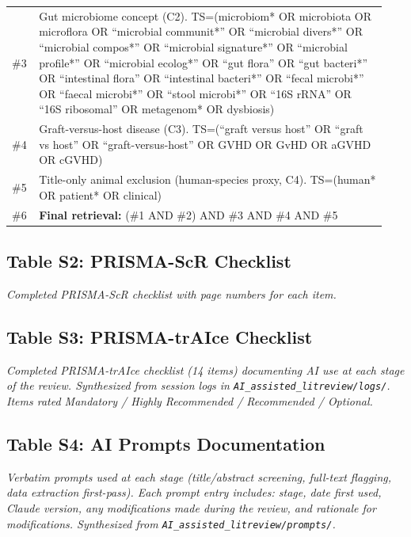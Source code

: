 \documentclass[11pt,a4paper]{article}
\newcommand{\placeholder}[1]{\par\noindent\colorbox{gray!15}{\parbox{\dimexpr\linewidth-2\fboxsep}{%
  \small\textit{#1}}}\par\medskip}
\begin{document}
\begin{longtable}{@{}p{0.06\linewidth} p{0.88\linewidth}@{}}
\#3 & Gut microbiome concept (C2).\newline
TS=(microbiom* OR microbiota OR microflora OR
``microbial communit*'' OR ``microbial divers*'' OR
``microbial compos*'' OR ``microbial signature*'' OR
``microbial profile*'' OR ``microbial ecolog*'' OR
``gut flora'' OR ``gut bacteri*'' OR
``intestinal flora'' OR ``intestinal bacteri*'' OR
``fecal microbi*'' OR ``faecal microbi*'' OR
``stool microbi*'' OR ``16S rRNA'' OR ``16S ribosomal'' OR
metagenom* OR dysbiosis)\\

\#4 & Graft-versus-host disease (C3).\newline
TS=(``graft versus host'' OR ``graft vs host'' OR
``graft-versus-host'' OR GVHD OR GvHD OR aGVHD OR cGVHD)\\

\#5 & Title-only animal exclusion (human-species proxy, C4).\newline
TS=(human* OR patient* OR clinical)
\\

\#6 & \textbf{Final retrieval:} (\#1 AND \#2) AND \#3 AND \#4 AND \#5\\

\end{longtable}
\endgroup

\subsection{Table S2: PRISMA-ScR Checklist}
\placeholder{Completed PRISMA-ScR checklist with page numbers for each item.}

\subsection{Table S3: PRISMA-trAIce Checklist}
\placeholder{Completed PRISMA-trAIce checklist (14 items) documenting AI use at each stage of the review. Synthesized from session logs in \texttt{AI\_assisted\_litreview/logs/}. Items rated Mandatory / Highly Recommended / Recommended / Optional.}

\subsection{Table S4: AI Prompts Documentation}
\placeholder{Verbatim prompts used at each stage (title/abstract screening, full-text flagging, data extraction first-pass). Each prompt entry includes: stage, date first used, Claude version, any modifications made during the review, and rationale for modifications. Synthesized from \texttt{AI\_assisted\_litreview/prompts/}.}
\end{document}
